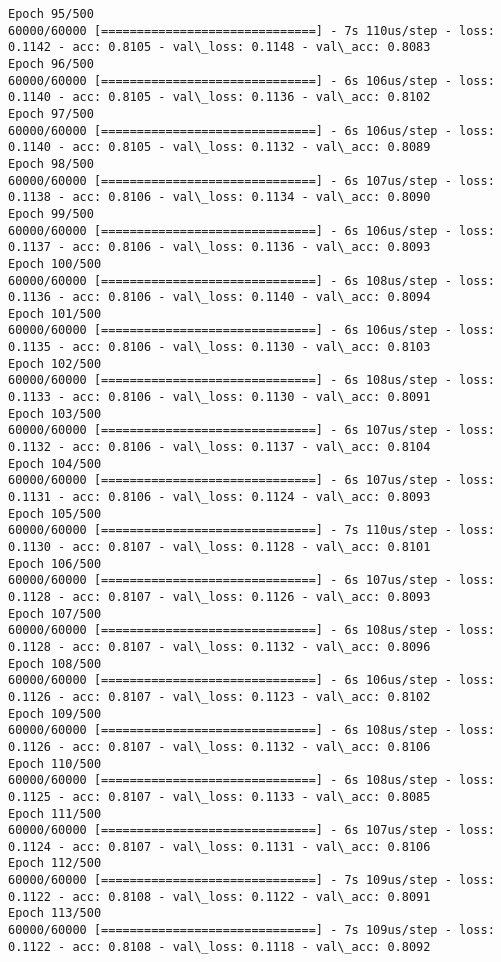 \documentclass[11pt]{article}
\begin{document}
\begin{Verbatim}[commandchars=\\\{\}]
Epoch 95/500
60000/60000 [==============================] - 7s 110us/step - loss: 0.1142 - acc: 0.8105 - val\_loss: 0.1148 - val\_acc: 0.8083
Epoch 96/500
60000/60000 [==============================] - 6s 106us/step - loss: 0.1140 - acc: 0.8105 - val\_loss: 0.1136 - val\_acc: 0.8102
Epoch 97/500
60000/60000 [==============================] - 6s 106us/step - loss: 0.1140 - acc: 0.8105 - val\_loss: 0.1132 - val\_acc: 0.8089
Epoch 98/500
60000/60000 [==============================] - 6s 107us/step - loss: 0.1138 - acc: 0.8106 - val\_loss: 0.1134 - val\_acc: 0.8090
Epoch 99/500
60000/60000 [==============================] - 6s 106us/step - loss: 0.1137 - acc: 0.8106 - val\_loss: 0.1136 - val\_acc: 0.8093
Epoch 100/500
60000/60000 [==============================] - 6s 108us/step - loss: 0.1136 - acc: 0.8106 - val\_loss: 0.1140 - val\_acc: 0.8094
Epoch 101/500
60000/60000 [==============================] - 6s 106us/step - loss: 0.1135 - acc: 0.8106 - val\_loss: 0.1130 - val\_acc: 0.8103
Epoch 102/500
60000/60000 [==============================] - 6s 108us/step - loss: 0.1133 - acc: 0.8106 - val\_loss: 0.1130 - val\_acc: 0.8091
Epoch 103/500
60000/60000 [==============================] - 6s 107us/step - loss: 0.1132 - acc: 0.8106 - val\_loss: 0.1137 - val\_acc: 0.8104
Epoch 104/500
60000/60000 [==============================] - 6s 107us/step - loss: 0.1131 - acc: 0.8106 - val\_loss: 0.1124 - val\_acc: 0.8093
Epoch 105/500
60000/60000 [==============================] - 7s 110us/step - loss: 0.1130 - acc: 0.8107 - val\_loss: 0.1128 - val\_acc: 0.8101
Epoch 106/500
60000/60000 [==============================] - 6s 107us/step - loss: 0.1128 - acc: 0.8107 - val\_loss: 0.1126 - val\_acc: 0.8093
Epoch 107/500
60000/60000 [==============================] - 6s 108us/step - loss: 0.1128 - acc: 0.8107 - val\_loss: 0.1132 - val\_acc: 0.8096
Epoch 108/500
60000/60000 [==============================] - 6s 106us/step - loss: 0.1126 - acc: 0.8107 - val\_loss: 0.1123 - val\_acc: 0.8102
Epoch 109/500
60000/60000 [==============================] - 6s 108us/step - loss: 0.1126 - acc: 0.8107 - val\_loss: 0.1132 - val\_acc: 0.8106
Epoch 110/500
60000/60000 [==============================] - 6s 108us/step - loss: 0.1125 - acc: 0.8107 - val\_loss: 0.1133 - val\_acc: 0.8085
Epoch 111/500
60000/60000 [==============================] - 6s 107us/step - loss: 0.1124 - acc: 0.8107 - val\_loss: 0.1131 - val\_acc: 0.8106
Epoch 112/500
60000/60000 [==============================] - 7s 109us/step - loss: 0.1122 - acc: 0.8108 - val\_loss: 0.1122 - val\_acc: 0.8091
Epoch 113/500
60000/60000 [==============================] - 7s 109us/step - loss: 0.1122 - acc: 0.8108 - val\_loss: 0.1118 - val\_acc: 0.8092

\end{Verbatim}
\end{document}
